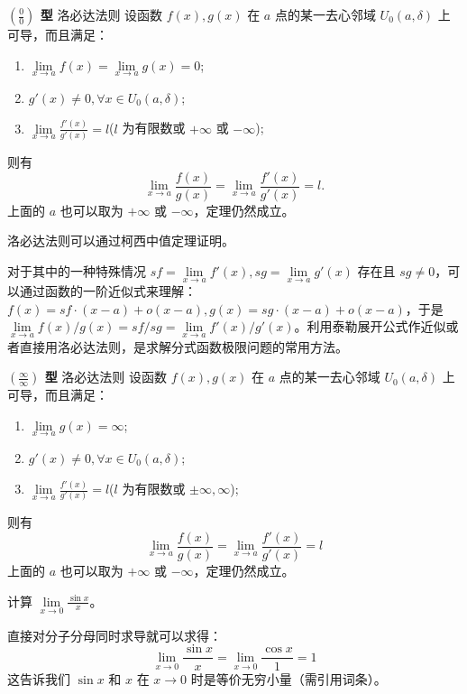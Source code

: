 
\begin{theorem}{\textbf{$\left(\frac{0}{0}\right)$ 型} 洛必达法则}
设函数 $f(x),g(x)$ 在 $a$ 点的某一去心邻域 $U_0(a,\delta)$ 上可导，而且满足：
\begin{enumerate}
\item $\lim\limits_{x\rightarrow a} f(x)=\lim\limits_{x\rightarrow a}g(x)=0$;
\item $g'(x)\neq 0,\forall x\in U_0(a,\delta)$;
\item $\lim\limits_{x\rightarrow a} \frac{f'(x)}{g'(x)}=l$($l$ 为有限数或 $+\infty$ 或 $-\infty$);
\end{enumerate}
则有
\begin{equation}
\lim\limits_{x\rightarrow a}\frac{f(x)}{g(x)}=\lim\limits_{x\rightarrow a}\frac{f'(x)}{g'(x)}=l.
\end{equation}
上面的 $a$ 也可以取为 $+\infty$ 或 $-\infty$，定理仍然成立。
\end{theorem}
洛必达法则可以通过柯西中值定理证明。

对于其中的一种特殊情况 $sf=\lim\limits_{x\rightarrow a}f'(x),sg=\lim\limits_{x\rightarrow a}g'(x)$ 存在且 $sg\neq 0$，可以通过函数的一阶近似式来理解：$f(x)=sf\cdot (x-a)+o(x-a),g(x)=sg\cdot (x-a)+o(x-a)$，于是 $\lim\limits_{x\rightarrow a}f(x)/g(x)=sf/sg=\lim\limits_{x\rightarrow a}f'(x)/g'(x)$。利用泰勒展开公式作近似或者直接用洛必达法则，是求解分式函数极限问题的常用方法。

\begin{theorem}{\textbf{$\left(\frac{\infty}{\infty}\right)$ 型} 洛必达法则}
设函数 $f(x),g(x)$ 在 $a$ 点的某一去心邻域 $U_0(a,\delta)$ 上可导，而且满足：
\begin{enumerate}
\item $\lim\limits_{x\rightarrow a} g(x)=\infty$;
\item $g'(x)\neq 0,\forall x\in U_0(a,\delta)$;
\item $\lim\limits_{x\rightarrow a} \frac{f'(x)}{g'(x)}=l$($l$ 为有限数或 $\pm\infty,\infty$);
\end{enumerate}
则有
\begin{equation}
\lim\limits_{x\rightarrow a}\frac{f(x)}{g(x)}=\lim\limits_{x\rightarrow a}\frac{f'(x)}{g'(x)}=l
\end{equation}
上面的 $a$ 也可以取为 $+\infty$ 或 $-\infty$，定理仍然成立。
\end{theorem}
\begin{exercise}{}
计算 $\lim\limits_{x\rightarrow 0}\frac{\sin x}{x}$。
\end{exercise}
直接对分子分母同时求导就可以求得：
\begin{equation}
    \lim\limits_{x\rightarrow 0}\frac{\sin x}{x}=\lim\limits_{x\rightarrow 0}\frac{\cos x}{1}=1
\end{equation}
这告诉我们 $\sin x$ 和 $x$ 在 $x\rightarrow 0$ 时是等价无穷小量（需引用词条）。

